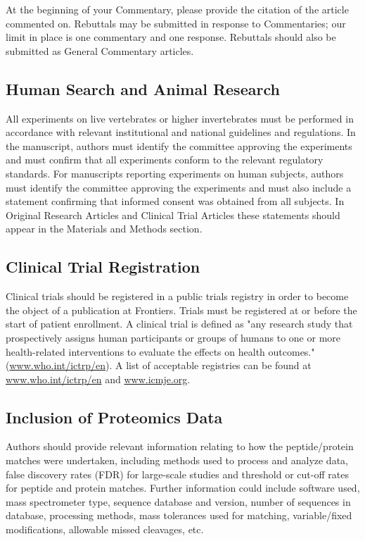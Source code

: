 \documentclass{frontiersSCNS} %
\begin{document}
At the beginning of your Commentary, please provide the citation of the article commented on. Rebuttals may be submitted in response to Commentaries; our limit in place is one commentary and one response. Rebuttals should also be submitted as General Commentary articles.

\subsection{Human Search and Animal Research}

All experiments on live vertebrates or higher invertebrates must be performed in accordance with relevant institutional and national guidelines and regulations. In the manuscript, authors must identify the committee approving the experiments and must confirm that all experiments conform to the relevant regulatory standards. For manuscripts reporting experiments on human subjects, authors must identify the committee approving the experiments and must also include a statement confirming that informed consent was obtained from all subjects. In Original Research Articles and Clinical Trial Articles these statements should appear in the Materials and Methods section.

\subsection{Clinical Trial Registration}

Clinical trials should be registered in a public trials registry in order to become the object of a publication at Frontiers. Trials must be registered at or before the start of patient enrollment. A clinical trial is defined as "any research study that prospectively assigns human participants or groups of humans to one or more health-related interventions to evaluate the effects on health outcomes."(\href{www.who.int/ictrp/en}{www.who.int/ictrp/en}). A list of acceptable registries can be found at \href{www.who.int/ictrp/en}{www.who.int/ictrp/en} and \href{www.icmje.org}{www.icmje.org}.

\subsection{Inclusion of Proteomics Data}

Authors should provide relevant information relating to how the peptide/protein matches were undertaken, including methods used to process and analyze data, false discovery rates (FDR) for large-scale studies and threshold or cut-off rates for peptide and protein matches. Further information could include software used, mass spectrometer type, sequence database and version, number of sequences in database, processing methods, mass tolerances used for matching, variable/fixed modifications, allowable missed cleavages, etc.
\end{document}
